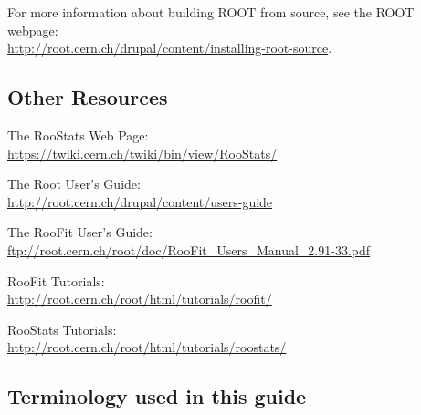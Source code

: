\documentclass[11pt]{article}
\begin{document}
\vspace{.2in}

For more information about building ROOT from source, see the ROOT webpage:\\ \url{http://root.cern.ch/drupal/content/installing-root-source}.  

\newpage
\subsection{Other Resources}

{\flushleft The RooStats Web Page}:\\
\url{https://twiki.cern.ch/twiki/bin/view/RooStats/}

{\flushleft The Root User's Guide}:\\
\url{http://root.cern.ch/drupal/content/users-guide}

{\flushleft The RooFit User's Guide:}\\
\url{ftp://root.cern.ch/root/doc/RooFit_Users_Manual_2.91-33.pdf}

{\flushleft RooFit Tutorials}:\\
 \url{http://root.cern.ch/root/html/tutorials/roofit/} 
 
{\flushleft RooStats Tutorials}:\\
 \url{http://root.cern.ch/root/html/tutorials/roostats/} 





\subsection{Terminology used in this guide}
\end{document}
